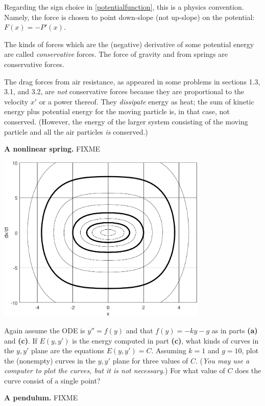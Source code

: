 \documentclass[12pt]{article}
\theoremstyle{definition}
\begin{document}
Regarding the sign choice in \eqref{potentialfunction}, this is a physics convention.  Namely, the force is chosen to point down-slope (not up-slope) on the potential: $F(x)=-P'(x)$.

The kinds of forces which are the (negative) derivative of some potential energy are called \emph{conservative} forces.  The force of gravity and from springs are conservative forces.

The drag forces from air resistance, as appeared in some problems in sections 1.3, 3.1, and 3.2, are \emph{not} conservative forces because they are proportional to the velocity $x'$ or a power thereof.  They \emph{dissipate} energy as heat; the sum of kinetic energy plus potential energy for the moving particle is, in that case, not conserved.  (However, the energy of the larger system consisting of the moving particle and all the air particles \emph{is} conserved.)

\medskip
\textbf{A nonlinear spring.}  FIXME

\includegraphics[width=0.75\textwidth]{nlspringcurves}

\begin{exerpart}
Again assume the ODE is $y''=f(y)$ and that $f(y)=-ky-g$ as in parts \textbf{(a)} and \textbf{(c)}.  If $E(y,y')$ is the energy computed in part \textbf{(c)}, what kinds of curves in the $y,y'$ plane are the equations $E(y,y')=C$.  Assuming $k=1$ and $g=10$, plot the (nonempty) curves in the $y,y'$ plane for three values of $C$.  (\emph{You may use a computer to plot the curves, but it is not necessary.})  For what value of $C$ does the curve consist of a single point?
\end{exerpart}

\medskip
\textbf{A pendulum.}  FIXME
\end{document}

